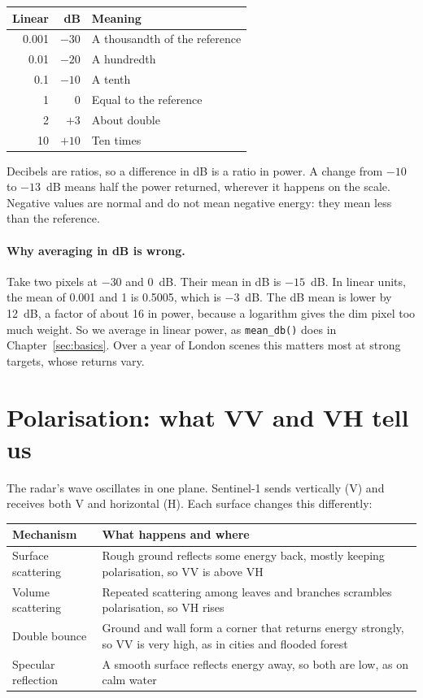 \begin{center}\begin{tabular}{rrl}
\toprule
Linear & dB & Meaning \\
\midrule
0.001 & $-30$ & A thousandth of the reference \\
0.01 & $-20$ & A hundredth \\
0.1 & $-10$ & A tenth \\
1 & 0 & Equal to the reference \\
2 & $+3$ & About double \\
10 & $+10$ & Ten times \\
\bottomrule
\end{tabular}\end{center}

Decibels are ratios, so a difference in dB is a ratio in power. A change from $-10$ to $-13$~dB means half the power returned, wherever it happens on the scale. Negative values are normal and do not mean negative energy: they mean less than the reference.

\paragraph{Why averaging in dB is wrong.} Take two pixels at $-30$ and $0$~dB. Their mean in dB is $-15$~dB. In linear units, the mean of 0.001 and 1 is 0.5005, which is $-3$~dB. The dB mean is lower by 12~dB, a factor of about 16 in power, because a logarithm gives the dim pixel too much weight. So we average in linear power, as \texttt{mean\_db()} does in Chapter~\ref{sec:basics}. Over a year of London scenes this matters most at strong targets, whose returns vary.

\section{Polarisation: what VV and VH tell us}
The radar's wave oscillates in one plane. Sentinel-1 sends vertically (V) and receives both V and horizontal (H). Each surface changes this differently:

\begin{tabularx}{\linewidth}{@{}lX@{}}
\toprule
Mechanism & What happens and where \\
\midrule
Surface scattering & Rough ground reflects some energy back, mostly keeping polarisation, so VV is above VH \\
Volume scattering & Repeated scattering among leaves and branches scrambles polarisation, so VH rises \\
Double bounce & Ground and wall form a corner that returns energy strongly, so VV is very high, as in cities and flooded forest \\
Specular reflection & A smooth surface reflects energy away, so both are low, as on calm water \\
\bottomrule
\end{tabularx}

